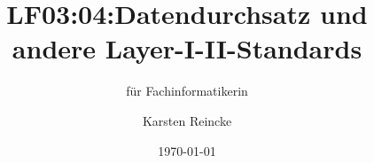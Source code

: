 \documentclass[]{beamer}
\title{LF03:04:Datendurchsatz und andere Layer-I-II-Standards}
\subtitle{für Fachinformatikerin}
\institute[GS-LDK]{Gewerbliche Schulen Dillenburg}
\author{Karsten Reincke}
\date{\today}
\def\cfgGl{../../../cfg.gl/}
\begin{document}

\begin{frame}
  \titlepage

  
\end{frame}






\logo{}
\newpage



%
\end{document}
